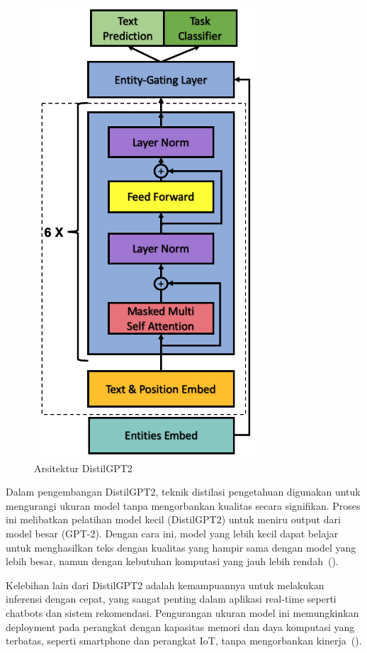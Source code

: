 \begin{figure}[H]
  \centering
  \includegraphics[scale=0.62]{gambar/DistilledGPT2Architecture.png}
  \caption{Arsitektur DistilGPT2}
  \label{fig:distilgpt2Architecture}
\end{figure}

Dalam pengembangan DistilGPT2, teknik distilasi pengetahuan digunakan untuk mengurangi ukuran model tanpa mengorbankan kualitas secara signifikan. Proses ini melibatkan pelatihan model kecil (DistilGPT2) untuk meniru output dari model besar (GPT-2). Dengan cara ini, model yang lebih kecil dapat belajar untuk menghasilkan teks dengan kualitas yang hampir sama dengan model yang lebih besar, namun dengan kebutuhan komputasi yang jauh lebih rendah~(\cite{sanh2019}).

Kelebihan lain dari DistilGPT2 adalah kemampuannya untuk melakukan inferensi dengan cepat, yang sangat penting dalam aplikasi real-time seperti chatbots dan sistem rekomendasi. Pengurangan ukuran model ini memungkinkan deployment pada perangkat dengan kapasitas memori dan daya komputasi yang terbatas, seperti smartphone dan perangkat IoT, tanpa mengorbankan kinerja~(\cite{merity2018}).

